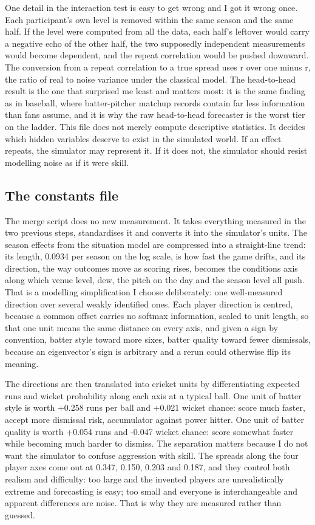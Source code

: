 \documentclass[11pt,letterpaper]{article}
\begin{document}
One detail in the interaction test is easy to get wrong and I got it wrong once. Each participant's own level is removed within the same season and the same half. If the level were computed from all the data, each half's leftover would carry a negative echo of the other half, the two supposedly independent measurements would become dependent, and the repeat correlation would be pushed downward. The conversion from a repeat correlation to a true spread uses r over one minus r, the ratio of real to noise variance under the classical model. The head-to-head result is the one that surprised me least and matters most: it is the same finding as in baseball, where batter-pitcher matchup records contain far less information than fans assume, and it is why the raw head-to-head forecaster is the worst tier on the ladder. This file does not merely compute descriptive statistics. It decides which hidden variables deserve to exist in the simulated world. If an effect repeats, the simulator may represent it. If it does not, the simulator should resist modelling noise as if it were skill.


\subsection{The constants file}

The merge script does no new measurement. It takes everything measured in the two previous steps, standardises it and converts it into the simulator's units. The season effects from the situation model are compressed into a straight-line trend: its length, 0.0934 per season on the log scale, is how fast the game drifts, and its direction, the way outcomes move as scoring rises, becomes the conditions axis along which venue level, dew, the pitch on the day and the season level all push. That is a modelling simplification I choose deliberately: one well-measured direction over several weakly identified ones. Each player direction is centred, because a common offset carries no softmax information, scaled to unit length, so that one unit means the same distance on every axis, and given a sign by convention, batter style toward more sixes, batter quality toward fewer dismissals, because an eigenvector's sign is arbitrary and a rerun could otherwise flip its meaning.


The directions are then translated into cricket units by differentiating expected runs and wicket probability along each axis at a typical ball. One unit of batter style is worth +0.258 runs per ball and +0.021 wicket chance: score much faster, accept more dismissal risk, accumulator against power hitter. One unit of batter quality is worth +0.054 runs and -0.047 wicket chance: score somewhat faster while becoming much harder to dismiss. The separation matters because I do not want the simulator to confuse aggression with skill. The spreads along the four player axes come out at 0.347, 0.150, 0.203 and 0.187, and they control both realism and difficulty: too large and the invented players are unrealistically extreme and forecasting is easy; too small and everyone is interchangeable and apparent differences are noise. That is why they are measured rather than guessed.
\end{document}

